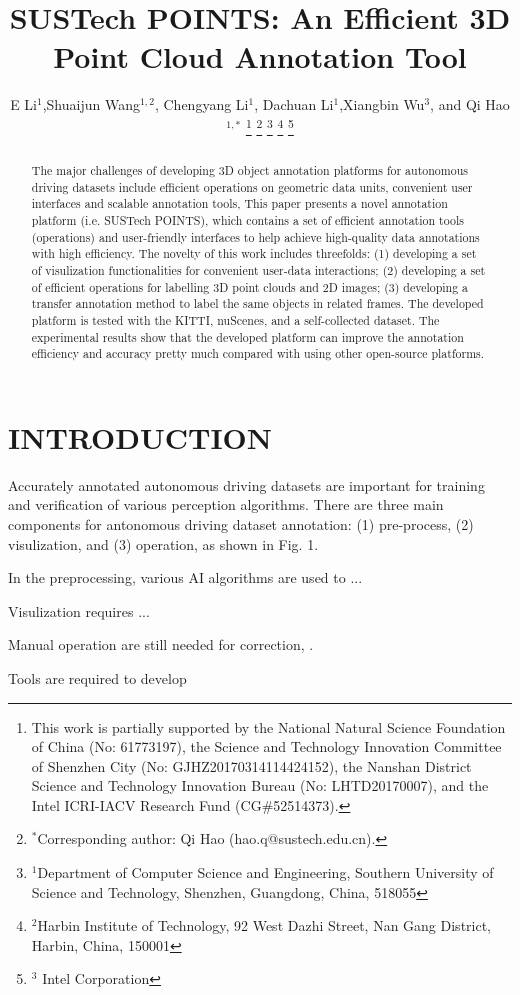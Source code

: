\documentclass[letterpaper, 10 pt, conference]{ieeeconf}  %
\title{\LARGE \bf
SUSTech POINTS: An Efficient 3D Point Cloud Annotation Tool
}
\author{E Li$^{1}$,Shuaijun Wang$^{1,2}$,  Chengyang Li$^{1}$, Dachuan Li$^{1}$,Xiangbin Wu$^{3}$, and Qi Hao$^{1,*}$%
\thanks{This work is partially supported by the National Natural Science Foundation of China (No: 61773197), the Science and Technology Innovation Committee of Shenzhen City (No: GJHZ20170314114424152), the Nanshan District Science and Technology Innovation Bureau (No: LHTD20170007), and the Intel ICRI-IACV Research Fund (CG$\#$52514373).}
\thanks{$^{*}$Corresponding author: Qi Hao (hao.q@sustech.edu.cn).}
\thanks{$^{1}$Department of Computer Science and Engineering,
Southern University of Science and Technology, Shenzhen, Guangdong, China, 518055}
\thanks{$^{2}$Harbin Institute of Technology,
92 West Dazhi Street, Nan Gang District, Harbin, China, 150001}%
\thanks{$^{3}$ Intel Corporation}%
}
\begin{document}
\maketitle
\thispagestyle{empty}
\pagestyle{empty}
\begin{abstract}
The major challenges of developing 3D object annotation platforms for autonomous driving datasets 
include efficient operations on geometric data units, convenient user interfaces and scalable annotation tools, This paper presents a novel annotation platform (i.e. SUSTech POINTS), which contains a set of efficient annotation tools (operations) and user-friendly interfaces to help achieve high-quality data annotations with high efficiency.
The novelty of this work includes threefolds: 
(1) developing a set of visulization functionalities for convenient user-data interactions;
(2) developing a set of efficient operations for labelling 3D point clouds and 2D images; 
(3) developing a transfer annotation method to label the same objects in related frames. 
The developed platform is tested with the KITTI, nuScenes, and a self-collected dataset. 
The experimental results show that the developed platform can improve the annotation efficiency and accuracy pretty much 
compared with using other open-source platforms.
\end{abstract}






\section{INTRODUCTION}

Accurately annotated autonomous driving datasets are important for training and verification of various perception algorithms.
There are three main components for antonomous driving dataset annotation: (1) pre-process, (2) visulization, and (3) operation, as shown in Fig. 1.

In the preprocessing, various AI algorithms are used to ...

Visulization requires ...

Manual operation are still needed for correction, . 


Tools are required to develop 
\end{document}
